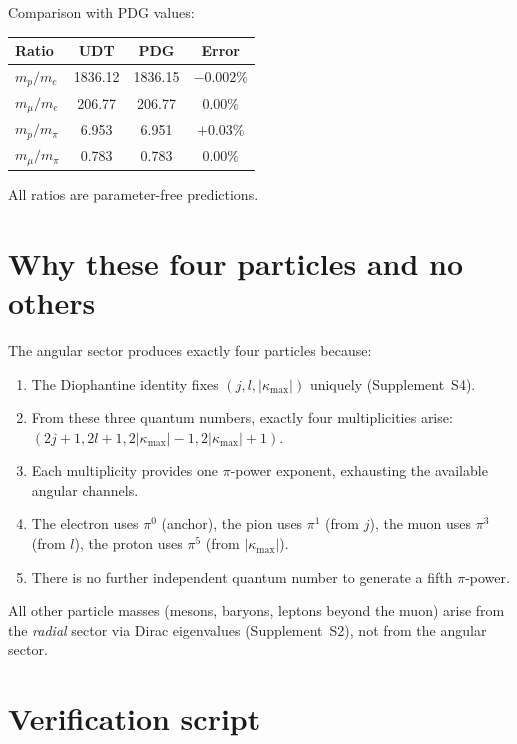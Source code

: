 \documentclass[11pt,letterpaper]{article}
\numberwithin{equation}{section}
\begin{document}
Comparison with PDG values:
\begin{center}
\begin{tabular}{lccc}
\toprule
Ratio & UDT & PDG & Error \\
\midrule
$m_p/m_e$ & 1836.12 & 1836.15 & $-0.002\%$ \\
$m_\mu/m_e$ & 206.77 & 206.77 & $0.00\%$ \\
$m_p/m_\pi$ & 6.953 & 6.951 & $+0.03\%$ \\
$m_\mu/m_\pi$ & 0.783 & 0.783 & $0.00\%$ \\
\bottomrule
\end{tabular}
\end{center}

All ratios are parameter-free predictions.

\section{Why these four particles and no others}
\label{sec:uniqueness}

The angular sector produces exactly four particles because:
\begin{enumerate}
  \item The Diophantine identity fixes $(j, l, |\kappa_\mathrm{max}|)$ uniquely
    (Supplement~S4).
  \item From these three quantum numbers, exactly four multiplicities arise:
    $(2j+1, 2l+1, 2|\kappa_\mathrm{max}|-1, 2|\kappa_\mathrm{max}|+1)$.
  \item Each multiplicity provides one $\pi$-power exponent, exhausting the
    available angular channels.
  \item The electron uses $\pi^0$ (anchor), the pion uses $\pi^1$
    (from $j$), the muon uses $\pi^3$ (from $l$), the proton uses $\pi^5$
    (from $|\kappa_\mathrm{max}|$).
  \item There is no further independent quantum number to generate a fifth
    $\pi$-power.
\end{enumerate}

All other particle masses (mesons, baryons, leptons beyond the muon)
arise from the \emph{radial} sector via Dirac eigenvalues (Supplement~S2),
not from the angular sector.

\section{Verification script}
\label{sec:verification}
\end{document}
